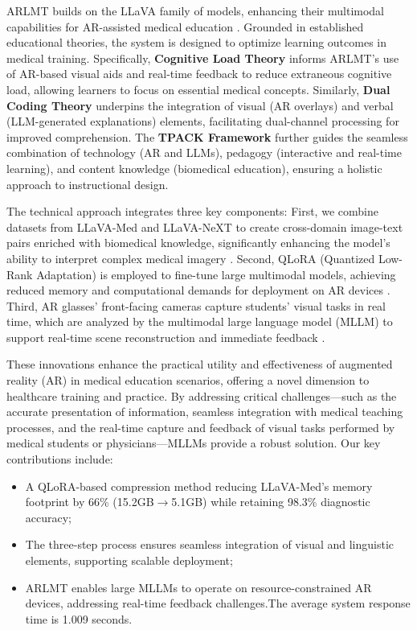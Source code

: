 \documentclass[10pt,letterpaper]{article}
\begin{document}
ARLMT builds on the LLaVA family of models, enhancing their multimodal capabilities for AR-assisted medical education \cite{liu2023llava}. Grounded in established educational theories, the system is designed to optimize learning outcomes in medical training. Specifically, \textbf{Cognitive Load Theory} \cite{sweller1988cognitive} informs ARLMT's use of AR-based visual aids and real-time feedback to reduce extraneous cognitive load, allowing learners to focus on essential medical concepts. Similarly, \textbf{Dual Coding Theory} \cite{paivio1986mental} underpins the integration of visual (AR overlays) and verbal (LLM-generated explanations) elements, facilitating dual-channel processing for improved comprehension. The \textbf{TPACK Framework} \cite{mishra2006technological} further guides the seamless combination of technology (AR and LLMs), pedagogy (interactive and real-time learning), and content knowledge (biomedical education), ensuring a holistic approach to instructional design.

The technical approach integrates three key components: First, we combine datasets from LLaVA-Med and LLaVA-NeXT to create cross-domain image-text pairs enriched with biomedical knowledge, significantly enhancing the model's ability to interpret complex medical imagery \cite{li2023llavamed, liu2024llavanext}. Second, QLoRA (Quantized Low-Rank Adaptation) is employed to fine-tune large multimodal models, achieving reduced memory and computational demands for deployment on AR devices \cite{dettmers2023qlora}. Third, AR glasses' front-facing cameras capture students' visual tasks in real time, which are analyzed by the multimodal large language model (MLLM) to support real-time scene reconstruction and immediate feedback \cite{battineni2024ai}.

These innovations enhance the practical utility and effectiveness of augmented reality (AR) in medical education scenarios, offering a novel dimension to healthcare training and practice. By addressing critical challenges—such as the accurate presentation of information, seamless integration with medical teaching processes, and the real-time capture and feedback of visual tasks performed by medical students or physicians—MLLMs provide a robust solution. Our key contributions include:
\begin{itemize}
    \item A QLoRA-based compression method reducing LLaVA-Med's memory footprint by 66\% (15.2GB$\rightarrow$5.1GB) while retaining 98.3\% diagnostic accuracy;
    \item The three-step process ensures seamless integration of visual and linguistic elements, supporting scalable deployment;
    \item ARLMT enables large MLLMs to operate on resource-constrained AR devices, addressing real-time feedback challenges.The average system response time is 1.009 seconds.
\end{itemize}
\end{document}

